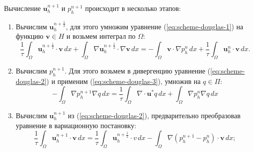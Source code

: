 \documentclass[12pt]{article}
\begin{document}
Вычисление ${\bm u}_h^{n+1}$ и $p_h^{n+1}$ происходит в несколько этапов:
\begin{enumerate}
\item 
Вычислим ${\bm u}_h^{n + \frac{1}{2}}$, для этого умножим уравнение (\ref{eq:scheme-douglas-1}) на функцию ${\bm v} \in H$ и возьмем интеграл по $\Omega$:
$$
\frac{1}{\tau}\int_{\Omega} {\bm u}_h^{n + \frac{1}{2}}\cdot {\bm v} \,dx + \int_{\Omega} \nabla {\bm u}_h^{n + \frac{1}{2}} \cdot \nabla {\bm v} \,dx = -\int_{\Omega} {\bm v} \cdot \nabla p_h^{n}\, dx + \frac{1}{\tau} \int_{\Omega} {\bm u}_h^{n} \cdot {\bm v} \,dx.
$$

\item Вычислим $p_h^{n+1}$. Для этого возьмем в дивергенцию уравнение ({\ref{eq:scheme-douglas-2}}) и применим  ({\ref{eq:scheme-douglas-3}}), умножив на $q \in \Pi$:
$$
-\int_{\Omega} \nabla p_h^{n+1} \nabla q \,dx = \frac{1}{\tau} \int_{\Omega} \nabla \cdot {\bm u}^* q \,dx + \int_{\Omega} \nabla p_h^{n} \nabla q \,dx
$$
\item 
Вычислим ${\bm u}_h^{n+1}$ из (\ref{eq:scheme-douglas-2}), предварительно преобразовав уравнение в вариационную постановку:
$$
\frac{1}{\tau} \int_{\Omega} {\bm u}_h^{n+1} \cdot {\bm v}\,dx = \frac{1}{\tau} \int_{\Omega} {\bm u}_h^{n+\frac{1}{2}} \cdot v \,dx - \int_{\Omega} \nabla (p_h^{n+1}-p_h^{n}) \cdot {\bm v} \,dx;
$$
\end{enumerate}
\end{document}
